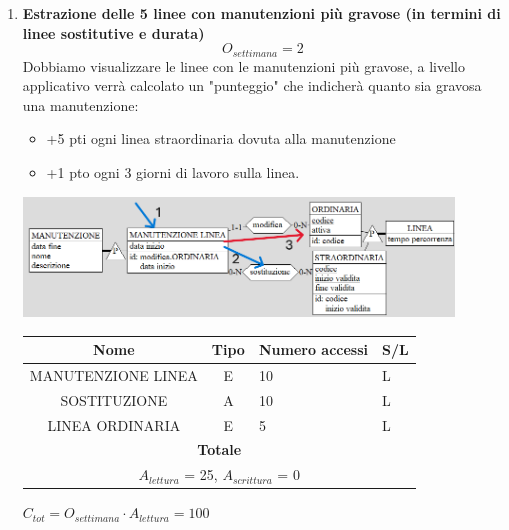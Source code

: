 \documentclass[12pt,a4paper]{report}
\begin{document}
\begin{enumerate}[label=\textbf{\arabic*}]

	\item \textbf{Estrazione delle 5 linee con manutenzioni più gravose (in termini di linee sostitutive e durata)} \label{op12} \\
	    \[ {O_{settimana} = 2} \]
	    Dobbiamo visualizzare le linee con le manutenzioni più gravose, a livello applicativo verrà calcolato un "punteggio" che indicherà quanto sia gravosa una manutenzione:
	    \begin{itemize}
		\renewcommand\labelitemi{--}
	        \item +5 pti ogni linea straordinaria dovuta alla manutenzione
	        \item +1 pto ogni 3 giorni di lavoro sulla  linea.
	    \end{itemize}
        \begin{center}
	    \includegraphics[width=0.9\textwidth]{op_12}
	    \end{center}
	    \begin{table}[H]
	    \centering
	    \begin{tabular}{|c|c|l|l|}
	    \hline
	    \textbf{Nome} & \textbf{Tipo} & \textbf{Numero accessi} & \textbf{S/L} \\
	    \hline
	    MANUTENZIONE LINEA & E & 10 & L \\
	    \hline
	    SOSTITUZIONE & A & 10 & L \\
	    \hline
	    LINEA ORDINARIA & E & 5 & L \\
	    \hline
	    \multicolumn{4}{c}{\textbf{Totale}} \\
	    \multicolumn{4}{c}{${A_{lettura}}$ = 25, ${A_{scrittura}}$ = 0} \\
	    \hline
	    \end{tabular}
	    \end{table}
	    \begin{center}
	    ${C_{tot} = {O_{settimana}}\cdot {A_{lettura}} = 100}$
	    \end{center}


\end{enumerate}
\end{document}
